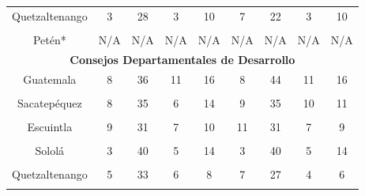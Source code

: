 {\begin{tabular}[t]{ccccccccc}
Quetzaltenango & 3 & 28 & 3 & 10 & 7 & 22 & 3 & 10\\
\cellcolor[HTML]{B6B3FF}{Quiché} & \cellcolor[HTML]{B6B3FF}{6} & \cellcolor[HTML]{B6B3FF}{27} & \cellcolor[HTML]{B6B3FF}{6} & \cellcolor[HTML]{B6B3FF}{19} & \cellcolor[HTML]{B6B3FF}{6} & \cellcolor[HTML]{B6B3FF}{28} & \cellcolor[HTML]{B6B3FF}{4} & \cellcolor[HTML]{B6B3FF}{19}\\
Petén* & N/A & N/A & N/A & N/A & N/A & N/A & N/A & N/A\\
\midrule
\multicolumn{9}{c}{\color{color3}\textbf{Consejos Departamentales de Desarrollo}}\\
\midrule
Guatemala & 8 & 36 & 11 & 16 & 8 & 44 & 11 & 16\\
\cellcolor[HTML]{B6B3FF}{El Progreso} & \cellcolor[HTML]{B6B3FF}{3} & \cellcolor[HTML]{B6B3FF}{27} & \cellcolor[HTML]{B6B3FF}{7} & \cellcolor[HTML]{B6B3FF}{10} & \cellcolor[HTML]{B6B3FF}{3} & \cellcolor[HTML]{B6B3FF}{27} & \cellcolor[HTML]{B6B3FF}{7} & \cellcolor[HTML]{B6B3FF}{9}\\
Sacatepéquez & 8 & 35 & 6 & 14 & 9 & 35 & 10 & 11\\
\cellcolor[HTML]{B6B3FF}{Chimaltenango} & \cellcolor[HTML]{B6B3FF}{13} & \cellcolor[HTML]{B6B3FF}{33} & \cellcolor[HTML]{B6B3FF}{11} & \cellcolor[HTML]{B6B3FF}{15} & \cellcolor[HTML]{B6B3FF}{12} & \cellcolor[HTML]{B6B3FF}{33} & \cellcolor[HTML]{B6B3FF}{10} & \cellcolor[HTML]{B6B3FF}{15}\\
Escuintla & 9 & 31 & 7 & 10 & 11 & 31 & 7 & 9\\
\cellcolor[HTML]{B6B3FF}{Santa Rosa} & \cellcolor[HTML]{B6B3FF}{4} & \cellcolor[HTML]{B6B3FF}{36} & \cellcolor[HTML]{B6B3FF}{6} & \cellcolor[HTML]{B6B3FF}{13} & \cellcolor[HTML]{B6B3FF}{5} & \cellcolor[HTML]{B6B3FF}{35} & \cellcolor[HTML]{B6B3FF}{5} & \cellcolor[HTML]{B6B3FF}{14}\\
Sololá & 3 & 40 & 5 & 14 & 3 & 40 & 5 & 14\\
\cellcolor[HTML]{B6B3FF}{Totonicapán} & \cellcolor[HTML]{B6B3FF}{5} & \cellcolor[HTML]{B6B3FF}{28} & \cellcolor[HTML]{B6B3FF}{6} & \cellcolor[HTML]{B6B3FF}{14} & \cellcolor[HTML]{B6B3FF}{4} & \cellcolor[HTML]{B6B3FF}{31} & \cellcolor[HTML]{B6B3FF}{6} & \cellcolor[HTML]{B6B3FF}{13}\\
Quetzaltenango & 5 & 33 & 6 & 8 & 7 & 27 & 4 & 6\\
\cellcolor[HTML]{B6B3FF}{Suchitepéquez} & \cellcolor[HTML]{B6B3FF}{16} & \cellcolor[HTML]{B6B3FF}{67} & \cellcolor[HTML]{B6B3FF}{17} & \cellcolor[HTML]{B6B3FF}{22} & \cellcolor[HTML]{B6B3FF}{15} & \cellcolor[HTML]{B6B3FF}{47} & \cellcolor[HTML]{B6B3FF}{15} & \cellcolor[HTML]{B6B3FF}{18}\\

\end{tabular}}
